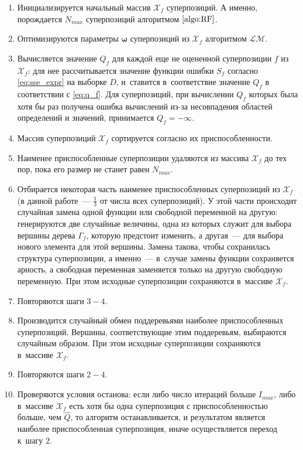 \documentclass[12pt,a4paper]{article}
\begin{document}
\begin{enumerate}
  \item Инициализируется начальный массив $\mathcal{X}_f$ суперпозиций.
	А именно, порождается $N_{max}$ суперпозиций алгоритмом $\ref{algo:RF}$.
  \item Оптимизируются параметры $\boldsymbol{\omega}$ суперпозиций
	из $\mathcal{X}_f$ алгоритмом $\mathcal{LM}$.
  \item Вычисляется значение $Q_f$ для каждой еще не оцененной суперпозиции
	$f$ из $\mathcal{X}_f$: для нее рассчитывается значение функции ошибки
	$S_f$ согласно \eqref{eq:sse_expr} на выборке $D$, и~ставится
	в~соответствие значение $Q_f$ в соответствии с \eqref{eq:q_f}. Для
	суперпозиций, при вычислении $Q_f$ которых была хотя бы раз получена
	ошибка вычислений из-за несовпадения областей определений и значений,
	принимается $Q_f = -\infty$.
  \item Массив суперпозиций $\mathcal{X}_f$ сортируется согласно их
	приспособленности.
  \item Наименее приспособленные суперпозиции удаляются из массива
	$\mathcal{X}_f$ до тех пор, пока его размер не станет равен $N_{max}$.
  \item Отбирается некоторая часть наименее приспособленных суперпозиций из
	$\mathcal{X}_f$ (в данной работе~--- $\frac{1}{3}$ от числа всех суперпозиций).
	У этой части происходит случайная замена одной функции
	или свободной переменной на другую: генерируются две случайные величины,
	одна из которых служит для выбора вершины дерева $\Gamma_f$, которую
	предстоит изменить, а другая~--- для выбора нового элемента для этой вершины.
	Замена такова, чтобы сохранилась структура суперпозиции, а именно~---
	в~случае замены функции сохраняется арность, а свободная переменная
	заменяется только на другую свободную переменную. При этом исходные
	суперпозиции сохраняются в~массиве $\mathcal{X}_f$.
  \item Повторяются шаги $3-4$.
  \item Производится случайный обмен поддеревьями наиболее приспособленных
	суперпозиций. Вершины, соответствующие этим поддеревьям, выбираются
	случайным образом. При этом исходные суперпозиции сохраняются в~массиве
	$\mathcal{X}_f$.
  \item Повторяются шаги $2-4$.
  \item Проверяются условия останова: если либо число итераций больше
	$I_{max}$, либо в~массиве $\mathcal{X}_f$ есть хотя бы одна суперпозиция с
	приспособленностью больше, чем $\hat{Q}$, то алгоритм останавливается,
	и результатом является наиболее приспособленная суперпозиция, иначе
	осуществляется переход к~шагу $2$.
\end{enumerate}
\end{document}
